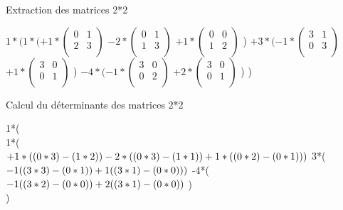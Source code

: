 \vspace{8mm} %
Extraction des matrices 2*2
\vspace{5mm} %

$
1*(1*(
+1*
\begin{pmatrix}
  0 & 1 \\
  2 & 3 \\
\end{pmatrix}
$
$
-2*
\begin{pmatrix}
  0 & 1 \\
  1 & 3 \\
\end{pmatrix}
$
$
+1*
\begin{pmatrix}
  0 & 0 \\
  1 & 2 \\
\end{pmatrix}
$
)
  $
  +3*(
  -1*
  \begin{pmatrix}
    3 & 1 \\
    0 & 3 \\
  \end{pmatrix}
  $
  $
  +1*
  \begin{pmatrix}
    3 & 0 \\
    0 & 1 \\
  \end{pmatrix}
  $
  )
  $
  -4*(
  -1*
  \begin{pmatrix}
    3 & 0 \\
    0 & 2 \\
  \end{pmatrix}
  $
  $
  +2*
  \begin{pmatrix}
    3 & 0 \\
    0 & 1 \\
  \end{pmatrix}
  $
  )
)

\newpage
\vspace{8mm} %
Calcul du déterminants des matrices 2*2
\vspace{5mm} %

1*(\\
1*(\\
  $
    +1*( (0*3) - (1*2))\\
    -2*( (0*3) - (1*1))\\
    +1*( (0*2) - (0*1))\\
    )\\
  $
  3*(\\
  $
    -1((3*3) - (0*1))\\
    +1((3*1) - (0*0))\\
    )\\
  $
  -4*(\\
  $
    -1((3*2) - (0*0))\\
    +2((3*1) - (0*0))\\
  $
  )\\
)\\



